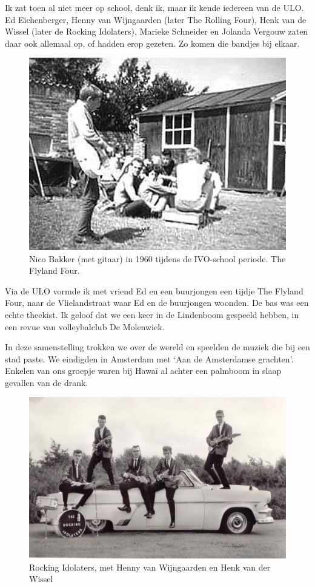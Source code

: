 \documentclass[10pt,twoside, openright]{memoir}
\begin{document}
\noindent Ik zat toen al niet meer op school, denk ik, maar ik kende iedereen van de ULO. Ed Eichenberger, Henny van Wijngaarden (later The Rolling Four), Henk van de Wissel (later de Rocking Idolaters), Marieke Schneider en Jolanda Vergouw zaten daar ook allemaal op, of hadden erop gezeten. Zo komen die bandjes bij elkaar.

\begin{figure}
\includegraphics[width=\textwidth]{img/ch25/nico}
\caption*{\footnotesize Nico Bakker (met gitaar) in 1960 tijdens de IVO-school periode. The Flyland Four.}
\end{figure}

Via de ULO vormde ik met vriend Ed en een buurjongen een tijdje The Flyland Four, naar de Vlielandstraat waar Ed en de buurjongen woonden. De bas was een echte theekist. Ik geloof dat we een keer in de Lindenboom gespeeld hebben, in een revue van volleybalclub De Molenwiek. 

In deze samenstelling trokken we over de wereld en speelden de muziek die bij een stad paste. We eindigden in Amsterdam met `Aan de Amsterdamse grachten'. Enkelen van ons groepje waren bij Hawaï al achter een palmboom in slaap gevallen van de drank. 

\begin{figure}
\includegraphics[width=\textwidth]{img/ch25/ri-2}
\caption*{\footnotesize Rocking Idolaters, met Henny van Wijngaarden en Henk van der Wissel}
\end{figure}  
\end{document}
